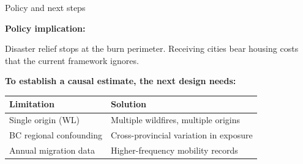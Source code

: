 \documentclass[aspectratio=169, 10pt]{beamer}
\begin{document}
\begin{frame}{Policy and next steps}

\textbf{Policy implication:}
\medskip

Disaster relief stops at the burn perimeter. Receiving cities bear housing costs
that the current framework ignores.

\bigskip
\textbf{To establish a causal estimate, the next design needs:}

\medskip
\begin{center}
\begin{tabular}{ll}
\toprule
Limitation & Solution \\
\midrule
Single origin (WL) & Multiple wildfires, multiple origins \\
BC regional confounding & Cross-provincial variation in exposure \\
Annual migration data & Higher-frequency mobility records \\
\bottomrule
\end{tabular}
\end{center}

\end{frame}
\end{document}
